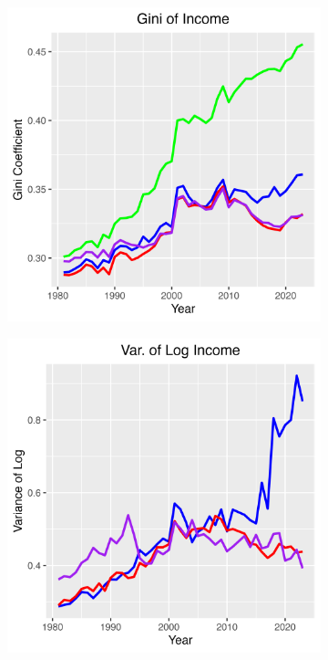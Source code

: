 \documentclass{article}
\begin{document}
\begin{figure}
\begin{subfigure}[t]{0.475\textwidth}
        \includegraphics[width=\textwidth]{figures/Fig_4/Fig_4b_Gini_inc.png}
        \label{fig:Trans_Asset_Gini1}
    \end{subfigure}
    \begin{subfigure}[t]{0.475\textwidth}
        \centering
        \includegraphics[width=\textwidth]{figures/Fig_4/Fig_4c_Var_inc.png}

\end{subfigure}
\end{figure}
\end{document}
